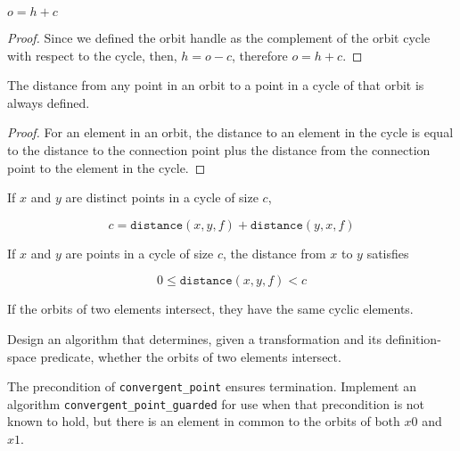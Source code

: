 \begin{lemma}
	$o = h + c$
\end{lemma}

\begin{proof}
	Since we defined the orbit handle as the complement of the orbit cycle with respect
	to the cycle, then, $h = o - c$, therefore $o = h + c$.
\end{proof}

\begin{lemma}
	The distance from any point in an orbit to a point in a cycle
	of that orbit is always defined.
\end{lemma}

\begin{proof}
	For an element in an orbit, the distance to an element in the cycle is equal to the
	distance to the connection point plus the distance from the connection point to the
	element in the cycle.
\end{proof}

\begin{lemma}
	If $x$ and $y$ are distinct points in a cycle of size $c$,
	
	\[ c = \mathtt{distance}(x, y, f) + \mathtt{distance}(y, x, f) \]
\end{lemma}

\begin{lemma}
	If $x$ and $y$ are points in a cycle of size $c$, the distance from $x$
	to $y$ satisfies

	\[ 0 \leq \mathtt{distance}(x, y, f) < c \]
\end{lemma}

\begin{lemma}
	If the orbits of two elements intersect, they have the same
	cyclic elements.
\end{lemma}

\begin{exercise}
	Design an algorithm that determines, given a transformation and its definition-space predicate,
	whether the orbits of two elements intersect.
\end{exercise}



\begin{exercise}
	The precondition of \verb|convergent_point| ensures termination. Implement an algorithm
	\verb|convergent_point_guarded| for use when that precondition is not known to hold, but
	there is an element in common to the orbits of both $x0$ and $x1$.
\end{exercise}

